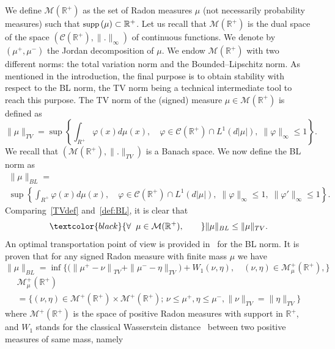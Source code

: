 \documentclass[AHL,Unicode,longabstracts,published]{cedram}
\newcommand*\dst{\displaystyle}
\newcommand*\R{\mathbb{R}}
\newcommand*\M{\mathcal{M}}
\newcommand{\clC}{\mathcal{C}}
\newcommand{\comMD}[1]{\textcolor{black}{#1}}
\newcommand*\supp{{\mbox{\small\rm supp}}\,}
\let\oldforall\forall
\renewcommand*{\forall}{\mathrel{\oldforall}}
\begin{document}
We define $\M(\R^+)$ as the set of Radon measures $\mu$ (not necessarily probability measures) such that $\supp(\mu) \subset \R^+$. Let us recall that $\M(\R^+)$ is the dual space of the space $(\clC(\R^+),\|.\|_{\infty})$ of continuous functions. We denote by $(\mu^+,\mu^-)$ the Jordan decomposition of $\mu$.
We endow $\M(\R^+)$ with two different norms: the total variation norm and the Bounded--Lipschitz norm. As mentioned in the introduction, the final purpose is to obtain stability with respect to the BL norm, the TV norm being a technical intermediate tool to reach this purpose.
The TV norm of the (signed) measure $\mu \in \M(\R^+)$ is defined as
\begin{equation}\label{TVdef}
\|\mu\|_{TV} = \sup \left\{\dst\int_{R^+} \varphi(x)d\mu(x), \quad \varphi \in \clC(\R^+)\cap L^1(d|\mu|), \; \|\varphi\|_{\infty} \leq 1\right\}.
\end{equation}
We recall that $(\M(\R^+),\|.\|_{TV})$ is a Banach space. We now define the BL norm as
\begin{multline}\label{def:BL}
\|\mu\|_{BL} =\\
\sup \left\{\dst\int_{R^+} \varphi(x)d\mu(x), \quad \varphi \in \clC(\R^+)\cap L^1(d|\mu|), \; \|\varphi\|_{\infty} \leq 1, \;
\|\varphi '\|_{\infty}\leq 1\right\}.
\end{multline}
Comparing~\eqref{TVdef} and~\eqref{def:BL}, it is clear that
\begin{equation}\label{BL_TV}
\comMD{\forall \; \mu\in \M(\R^+),\qquad} \|\mu\|_{BL} \leq \|\mu\|_{TV}.
\end{equation}
An optimal transportation point of view is provided in~\cite[Proposition~23]{PRT17} for the BL norm. It is proven that for any signed Radon measure with finite mass $\mu$ we have
\begin{equation}\label{BLdef}
\|\mu\|_{BL} =\inf \Big\{ \big(\left\|\mu^+ - \nu\right\|_{TV} +\|\mu^-- \eta\|_{TV}\big)+ W_1(\nu,\eta),\quad (\nu, \eta) \in \M_{ \mu }^+(\R^+),\Big\}
\end{equation}
\begin{multline}\label{BLdef2}
 \M_{ \mu }^+(\R^+)\\
=\Big\{ (\nu, \eta)\in \M^+(\R^+)\times \M^+(\R^+);\, \nu\leq \mu^+, \eta \leq \mu^-, \|\nu\|_{TV}=\|\eta\|_{TV}
\Big\}
\end{multline}
where $\M^+(\R^+)$ is the space of positive Radon measures with support in $\R^+$, and $W_1$ stands for the classical Wasserstein distance~\cite{Villani_topics} between two positive measures of same mass, namely
\end{document}
